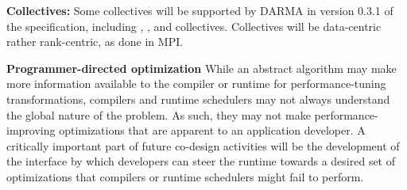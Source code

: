 \begin{compactdesc}
\item {\bf Collectives:}
  Some collectives will be supported by \gls{DARMA} in version 0.3.1 of
  the specification, including ,
  , and  collectives.
  Collectives will be data-centric rather \gls{rank}-centric, as done in MPI.
\item{\bf Programmer-directed optimization}
While an abstract algorithm may make more information available to the compiler or runtime for performance-tuning transformations,
compilers and runtime schedulers may not always understand the global nature of the problem.
As such, they may not make performance-improving optimizations that are apparent to an application developer.
A critically important part of future co-design activities will be the
development of the interface by which developers can steer the runtime towards
a desired set of optimizations that compilers or runtime schedulers might fail
to perform.
\end{compactdesc}






 

